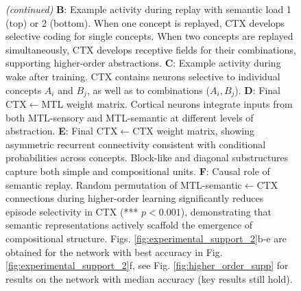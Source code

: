 \documentclass{article}
\begin{document}
\begin{figure}[h!]
  \ContinuedFloat
  \captionsetup{list=off} %
  \caption{\textit{(continued)} \textbf{B}: Example activity during replay with semantic load 1 (top) or 2 (bottom). When one concept is replayed, CTX develops selective coding for single concepts. When two concepts are replayed simultaneously, CTX develops receptive fields for their combinations, supporting higher-order abstractions.  
\textbf{C}: Example activity during wake after training. CTX contains neurons selective to individual concepts $A_i$ and $B_j$, as well as to combinations ($A_i, B_j$).  
\textbf{D}: Final CTX$\leftarrow$MTL weight matrix. Cortical neurons integrate inputs from both MTL-sensory and MTL-semantic at different levels of abstraction.
\textbf{E}: Final CTX$\leftarrow$CTX weight matrix, showing asymmetric recurrent connectivity consistent with conditional probabilities across concepts. Block-like and diagonal substructures capture both simple and compositional units.  
\textbf{F}: Causal role of semantic replay. Random permutation of MTL-semantic$\leftarrow$CTX connections during higher-order learning significantly reduces episode selectivity in CTX (*** $p<0.001$), demonstrating that semantic representations actively scaffold the emergence of compositional structure. Figs. \ref{fig:experimental_support_2}b-e are obtained for the network with best accuracy in Fig. \ref{fig:experimental_support_2}f, see Fig. \ref{fig:higher_order_supp} for results on the network with median accuracy (key results still hold).}
\end{figure}
\clearpage
\end{document}
